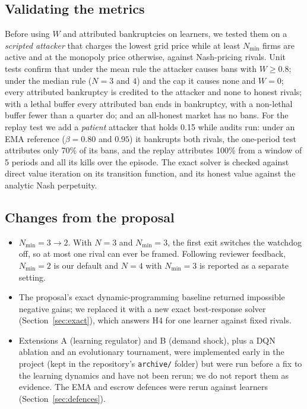 \documentclass{article}
\newcommand{\Nmin}{N_{\min}}
\begin{document}
\subsection{Validating the metrics}
\label{sec:validate}
Before using $W$ and attributed bankruptcies on learners, we tested them on a \emph{scripted attacker} that charges the lowest grid price while at least $\Nmin$ firms are active and at the monopoly price otherwise, against Nash-pricing rivals. Unit tests confirm that under the mean rule the attacker causes bans with $W\ge0.8$; under the median rule ($N=3$ and $4$) and the cap it causes none and $W=0$; every attributed bankruptcy is credited to the attacker and none to honest rivals; with a lethal buffer every attributed ban ends in bankruptcy, with a non-lethal buffer fewer than a quarter do; and an all-honest market has no bans. For the replay test we add a \emph{patient} attacker that holds 0.15 while audits run: under an EMA reference ($\beta=0.80$ and $0.95$) it bankrupts both rivals, the one-period test attributes only 70\% of its bans, and the replay attributes 100\% from a window of 5 periods and all its kills over the episode. The exact solver is checked against direct value iteration on its transition function, and its honest value against the analytic Nash perpetuity.

\subsection{Changes from the proposal}
\begin{itemize}
\item $\Nmin=3\to2$. With $N=3$ and $\Nmin=3$, the first exit switches the watchdog off, so at most one rival can ever be framed. Following reviewer feedback, $\Nmin=2$ is our default and $N=4$ with $\Nmin=3$ is reported as a separate setting.
\item The proposal's exact dynamic-programming baseline returned impossible negative gains; we replaced it with a new exact best-response solver (Section~\ref{sec:exact}), which answers H4 for one learner against fixed rivals.
\item Extensions A (learning regulator) and B (demand shock), plus a DQN ablation and an evolutionary tournament, were implemented early in the project (kept in the repository's \texttt{archive/} folder) but were run before a fix to the learning dynamics and have not been rerun; we do not report them as evidence. The EMA and escrow defences were rerun against learners (Section~\ref{sec:defences}).
\end{itemize}
\end{document}

